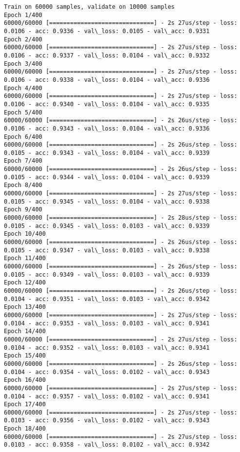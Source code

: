 \documentclass[11pt]{article}
\begin{document}
    \begin{Verbatim}[commandchars=\\\{\}]
Train on 60000 samples, validate on 10000 samples
Epoch 1/400
60000/60000 [==============================] - 2s 27us/step - loss: 0.0106 - acc: 0.9336 - val\_loss: 0.0105 - val\_acc: 0.9331
Epoch 2/400
60000/60000 [==============================] - 2s 27us/step - loss: 0.0106 - acc: 0.9337 - val\_loss: 0.0104 - val\_acc: 0.9332
Epoch 3/400
60000/60000 [==============================] - 2s 27us/step - loss: 0.0106 - acc: 0.9338 - val\_loss: 0.0104 - val\_acc: 0.9336
Epoch 4/400
60000/60000 [==============================] - 2s 27us/step - loss: 0.0106 - acc: 0.9340 - val\_loss: 0.0104 - val\_acc: 0.9335
Epoch 5/400
60000/60000 [==============================] - 2s 26us/step - loss: 0.0106 - acc: 0.9343 - val\_loss: 0.0104 - val\_acc: 0.9336
Epoch 6/400
60000/60000 [==============================] - 2s 26us/step - loss: 0.0105 - acc: 0.9343 - val\_loss: 0.0104 - val\_acc: 0.9339
Epoch 7/400
60000/60000 [==============================] - 2s 26us/step - loss: 0.0105 - acc: 0.9344 - val\_loss: 0.0104 - val\_acc: 0.9339
Epoch 8/400
60000/60000 [==============================] - 2s 27us/step - loss: 0.0105 - acc: 0.9345 - val\_loss: 0.0104 - val\_acc: 0.9338
Epoch 9/400
60000/60000 [==============================] - 2s 28us/step - loss: 0.0105 - acc: 0.9345 - val\_loss: 0.0103 - val\_acc: 0.9339
Epoch 10/400
60000/60000 [==============================] - 2s 26us/step - loss: 0.0105 - acc: 0.9347 - val\_loss: 0.0103 - val\_acc: 0.9338
Epoch 11/400
60000/60000 [==============================] - 2s 26us/step - loss: 0.0105 - acc: 0.9349 - val\_loss: 0.0103 - val\_acc: 0.9339
Epoch 12/400
60000/60000 [==============================] - 2s 26us/step - loss: 0.0104 - acc: 0.9351 - val\_loss: 0.0103 - val\_acc: 0.9342
Epoch 13/400
60000/60000 [==============================] - 2s 27us/step - loss: 0.0104 - acc: 0.9353 - val\_loss: 0.0103 - val\_acc: 0.9341
Epoch 14/400
60000/60000 [==============================] - 2s 27us/step - loss: 0.0104 - acc: 0.9352 - val\_loss: 0.0103 - val\_acc: 0.9341
Epoch 15/400
60000/60000 [==============================] - 2s 26us/step - loss: 0.0104 - acc: 0.9354 - val\_loss: 0.0102 - val\_acc: 0.9343
Epoch 16/400
60000/60000 [==============================] - 2s 27us/step - loss: 0.0104 - acc: 0.9357 - val\_loss: 0.0102 - val\_acc: 0.9341
Epoch 17/400
60000/60000 [==============================] - 2s 27us/step - loss: 0.0103 - acc: 0.9356 - val\_loss: 0.0102 - val\_acc: 0.9343
Epoch 18/400
60000/60000 [==============================] - 2s 27us/step - loss: 0.0103 - acc: 0.9358 - val\_loss: 0.0102 - val\_acc: 0.9342

\end{Verbatim}
\end{document}
